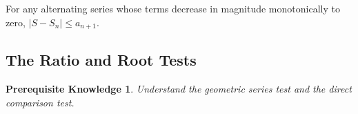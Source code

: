 \documentclass{myarticle}
\theoremstyle{nospace}
\newtheorem*{oldprereq}{Prerequisite Knowledge}
\newenvironment{prereq}{\begin{mdframed}\begin{oldprereq}}{\end{oldprereq}\end{mdframed}}
\newtheorem{old series theorem}{Theorem}
\newenvironment{series theorem}{\begin{mdframed}\begin{old series theorem}}{\end{old series theorem}\end{mdframed}}
\begin{document}
\begin{series theorem} For any alternating series whose terms decrease in magnitude monotonically to zero, $|S - S_n| \leq a_{n+1}$. \end{series theorem}

\subsection{The Ratio and Root Tests} \label{sec:ratio and root tests}

\begin{prereq} Understand the geometric series test and the direct comparison test. \end{prereq}

\begin{figure}[htbp] \centering
\begin{tikzpicture}


\end{tikzpicture}
\end{figure}
\end{document}
